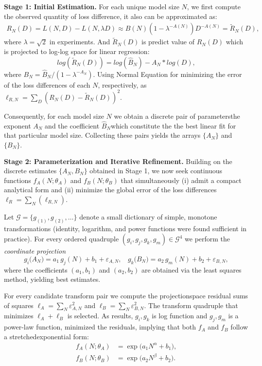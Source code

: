 \documentclass{article}
\begin{document}
\textbf{Stage 1: Initial Estimation.}
For each unique model size $N$, we first compute the  observed quantity of loss difference, it also can be approximated as:
\begin{align}
    R_N (D) = L(N,D) - L(N,\lambda D)\approx B(N)(1 - \lambda^{-A(N)})D^{-A(N)}=\tilde{R}_N(D),
\end{align}
where $\lambda = \sqrt{2}$ in experiments. And $\tilde{R}_N(D)$ is predict value of $R_N(D)$ which is projected to log-log space for linear regression:
\begin{equation} \label{eq:R_N_D_power_law_fitting}
log(\tilde{R}_{N}(D)) = log(\hat{B}_{N}) - A_{N} * log(D),
\end{equation}
where $B_N = \hat{B}_{N}/(1-\lambda^{-A_N} )$. 
Using Normal Equation \cite{gauss1809} for minimizing the error of the loss differences of each $N$, respectively, as 
$\ell_{R,N} = \sum_{D}(R_N(D)-\tilde{R}_N(D))^2$.

Consequently, for each model size $N$ we obtain a discrete pair of parameters\text{-}the exponent $A_N$ and the coefficient $\hat{B}_N$\text{-}which constitute the the best linear fit for that particular model size. Collecting these pairs yields the arrays $\{A_N\}$ and $\{B_N\}$. 


\textbf{Stage 2: Parameterization and Iterative Refinement.}
Building on the discrete estimates $\{A_N,B_N\}$ obtained in Stage 1, we now seek continuous functions
\(
f_A(N;\theta_A)\) and \(f_B(N;\theta_B)\) that simultaneously
(i) admit a compact analytical form and (ii) minimize the global error of the loss differences $\ell_R=\sum_N(\ell_{R,N})$.

Let \(\mathcal{G}=\{g_{(1)},g_{(2)},\ldots\}\) denote a small dictionary of
simple, monotone transformations (identity, logarithm, and power
functions were found sufficient in practice).  For every ordered
quadruple \((g_i,g_j,g_k,g_m)\in\mathcal{G}^4\) we perform the
\emph{coordinate projection}
\begin{equation}
  g_i\!\bigl(A_N\bigr) = a_1\,g_j(N) + b_1 + \varepsilon_{A,N},\ \ \ \ 
  g_k\!\bigl(B_N\bigr) = a_2\,g_m(N) + b_2 + \varepsilon_{B,N},
\end{equation}
where the coefficients $(a_1,b_1)$ and $(a_2,b_2)$ are obtained via the least squares method, yielding best estimates.

For every candidate transform pair we compute the
projection\text{-}space residual sums of squares
\(
\ell_A=\sum_N\varepsilon_{A,N}^2\) and
\(\ell_B=\sum_N\varepsilon_{B,N}^2\).
The transform quadruple that minimizes \(\ell_A+\ell_B\) is selected.
As results, 
\(g_i,g_k\) is log function and
\(g_j,g_m\) is a power-law function,
minimized the residuals, implying that both \(f_A\) and \(f_B\) follow
a stretched\text{-}exponential form:
\begin{align}
  f_A(N;\theta_A) &= \exp\!\bigl(a_1N^{\alpha}+b_1\bigr),\label{eq:fa_stretched_exp_main_v2_repeat} \\ 
  f_B(N;\theta_B) &= \exp\!\bigl(a_2N^{\beta}+b_2\bigr).\label{eq:fb_stretched_exp_main_v2_repeat}
\end{align}
\end{document}
